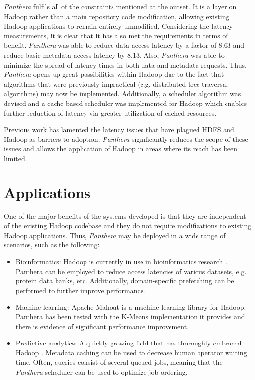 \documentclass[12pt]{article}
\begin{document}
\textit{Panthera} fulfils all of the constraints mentioned at the outset. It is a layer on Hadoop rather than a main repository code modification, allowing existing Hadoop applications to remain entirely unmodified. Considering the latency measurements, it is clear that it has also met the requirements in terms of benefit. \textit{Panthera} was able to reduce data access latency by a factor of 8.63 and reduce basic metadata access latency by 8.13. Also, \textit{Panthera} was able to minimize the spread of latency times in both data and metadata requests. Thus, \textit{Panthera} opens up great possibilities within Hadoop due to the fact that algorithms that were previously impractical (e.g. distributed tree traversal algorithms) may now be implemented. Additionally, a scheduler algorithm was devised and a cache-based scheduler was implemented for Hadoop which enables further reduction of latency via greater utilization of cached resources.

Previous work \cite{hdfs, borthakur2011apache} has lamented the latency issues that have plagued HDFS and Hadoop as barriers to adoption. \textit{Panthera} significantly reduces the scope of these issues and allows the application of Hadoop in areas where its reach has been limited.

\section{Applications}
One of the major benefits of the systems developed is that they are independent of the existing Hadoop codebase and they do not require modifications to existing Hadoop applications. Thus, \textit{Panthera} may be deployed in a wide range of scenarios, such as the following:

\begin{itemize}
	\item Bioinformatics: Hadoop is currently in use in bioinformatics research \cite{taylor2010overview}. Panthera can be employed to reduce access latencies of various datasets, e.g. protein data banks, etc. Additionally, domain-specific prefetching can be performed to further improve performance.
	
	\item Machine learning: Apache Mahout is a machine learning library for Hadoop. Panthera has been tested with the K-Means implementation it provides and there is evidence of significant performance improvement.
	
	\item Predictive analytics: A quickly growing field that has thoroughly
	embraced Hadoop \cite{chen2012business}. Metadata caching can be used to decrease human operator waiting time. Often, queries consist of several queued jobs, meaning that the \textit{Panthera} scheduler can be used to optimize
	job ordering.
\end{itemize}
\end{document}
